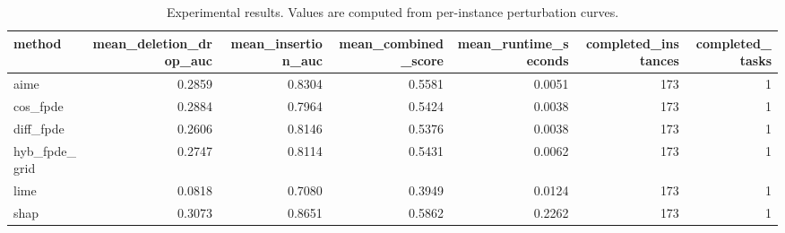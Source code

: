\begin{table}[t]
\caption{Experimental results. Values are computed from per-instance perturbation curves.}
\label{tab:main_results_computed}
\centering
\begin{tabular}{lrrrrrr}
\toprule
method & mean\_deletion\_drop\_auc & mean\_insertion\_auc & mean\_combined\_score & mean\_runtime\_seconds & completed\_instances & completed\_tasks \\
\midrule
aime & 0.2859 & 0.8304 & 0.5581 & 0.0051 & 173 & 1 \\
cos\_fpde & 0.2884 & 0.7964 & 0.5424 & 0.0038 & 173 & 1 \\
diff\_fpde & 0.2606 & 0.8146 & 0.5376 & 0.0038 & 173 & 1 \\
hyb\_fpde\_grid & 0.2747 & 0.8114 & 0.5431 & 0.0062 & 173 & 1 \\
lime & 0.0818 & 0.7080 & 0.3949 & 0.0124 & 173 & 1 \\
shap & 0.3073 & 0.8651 & 0.5862 & 0.2262 & 173 & 1 \\
\bottomrule
\end{tabular}

\end{table}

